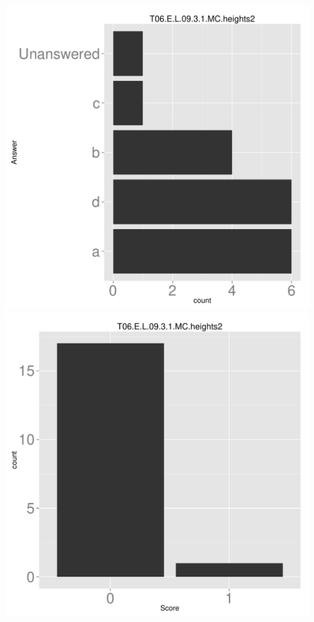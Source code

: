 \documentclass[12pt,english,nohyper]{tufte-handout}\usepackage[]{graphicx}\usepackage[]{color}
\begin{document}
\begin{center} \includegraphics[width=.45\linewidth]{Topic06_AB_37_answer} \includegraphics[width=.45\linewidth]{Topic06_AB_37_score} \end{center} 
\end{document}
